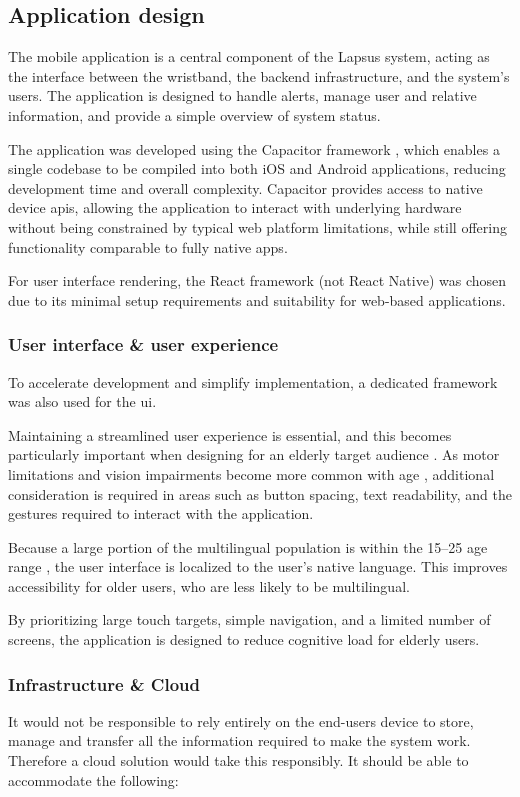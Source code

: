 \subsection{Application design}
The mobile application is a central component of the Lapsus system, acting as the interface between the wristband, the backend infrastructure, and the system’s users. The application is designed to handle alerts, manage user and relative information, and provide a simple overview of system status.

The application was developed using the Capacitor framework \cite{ionic_capacitor_nodate}, which enables a single codebase to be compiled into both iOS and Android applications, reducing development time and overall complexity. Capacitor provides access to native device \gls{api}s, allowing the application to interact with underlying hardware without being constrained by typical web platform limitations, while still offering functionality comparable to fully native apps.

For user interface rendering, the React framework (not React Native) was chosen due to its minimal setup requirements and suitability for web-based applications.

\subsubsection{User interface \& user experience}
To accelerate development and simplify implementation, a dedicated framework was also used for the \gls{ui}.

Maintaining a streamlined user experience is essential, and this becomes particularly important when designing for an elderly target audience \cite{gomez-hernandez_design_2023}. As motor limitations and vision impairments become more common with age \cite{noauthor_people_nodate}, additional consideration is required in areas such as button spacing, text readability, and the gestures required to interact with the application.

Because a large portion of the multilingual population is within the 15--25 age range \cite{noauthor_eurobarometer_nodate}, the user interface is localized to the user’s native language. This improves accessibility for older users, who are less likely to be multilingual.

By prioritizing large touch targets, simple navigation, and a limited number of screens, the application is designed to reduce cognitive load for elderly users.

\subsubsection{Infrastructure \& Cloud}
It would not be responsible to rely entirely on the end-users device to store, manage and transfer all the information required to make the system work. Therefore a cloud solution would take this responsibly. It should be able to accommodate the following:

